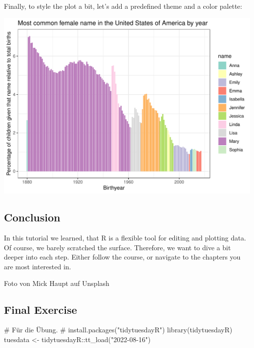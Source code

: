 \documentclass[
  letterpaper,
  DIV=11,
  numbers=noendperiod]{scrartcl}
\newenvironment{Shaded}{\begin{snugshade}}{\end{snugshade}}
\newcommand{\CommentTok}[1]{\textcolor[rgb]{0.37,0.37,0.37}{#1}}
\newcommand{\FunctionTok}[1]{\textcolor[rgb]{0.28,0.35,0.67}{#1}}
\newcommand{\NormalTok}[1]{\textcolor[rgb]{0.00,0.23,0.31}{#1}}
\newcommand{\OtherTok}[1]{\textcolor[rgb]{0.00,0.23,0.31}{#1}}
\newcommand{\SpecialCharTok}[1]{\textcolor[rgb]{0.37,0.37,0.37}{#1}}
\newcommand{\StringTok}[1]{\textcolor[rgb]{0.13,0.47,0.30}{#1}}
\begin{document}
Finally, to style the plot a bit, let's add a predefined theme and a
color palette:

\includegraphics{the_big_picture_files/figure-pdf/plot-smaller-diamonds-1.pdf}

\hypertarget{conclusion}{%
\subsection{Conclusion}\label{conclusion}}

In this tutorial we learned, that R is a flexible tool for editing and
plotting data. Of course, we barely scratched the surface. Therefore, we
want to dive a bit deeper into each step. Either follow the course, or
navigate to the chapters you are most interested in.

Foto von Mick Haupt auf Unsplash

\hypertarget{final-exercise}{%
\subsection{Final Exercise}\label{final-exercise}}

\begin{Shaded}
\begin{Highlighting}[]
\CommentTok{\# Für die Übung.}
\CommentTok{\# install.packages("tidytuesdayR")}
\FunctionTok{library}\NormalTok{(tidytuesdayR)}
\NormalTok{tuesdata }\OtherTok{\textless{}{-}}\NormalTok{ tidytuesdayR}\SpecialCharTok{::}\FunctionTok{tt\_load}\NormalTok{(}\StringTok{"2022{-}08{-}16"}\NormalTok{)}
\end{Highlighting}
\end{Shaded}
\end{document}
